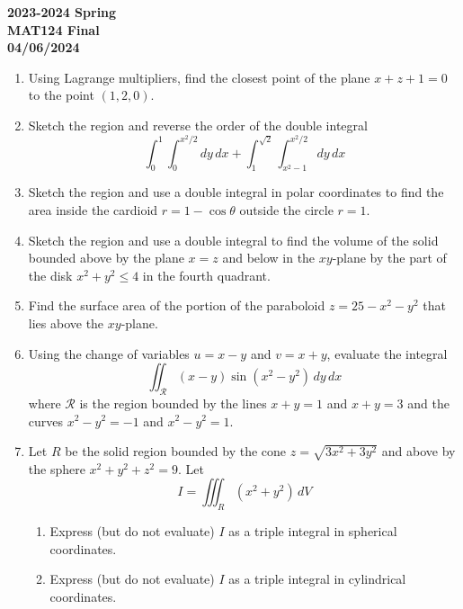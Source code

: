 \documentclass[a4paper, 12pt]{article}
\begin{document}
\pagestyle{empty}

\begin{center}
\textbf{2023-2024 Spring \\MAT124 Final\\04/06/2024}
\end{center}

\begin{enumerate}[leftmargin=*,label=\textbf{\arabic*.}]
\item Using Lagrange multipliers, find the closest point of the plane $x+z+1=0$ to the point $(1,2,0)$.

\item Sketch the region and reverse the order of the double integral
\[\int_0^1\int_0^{x^2/2}dy\,dx+\int_1^{\sqrt2}\int_{x^2-1}^{x^2/2}dy\,dx\]

\item Sketch the region and use a double integral in polar coordinates to find the area inside the cardioid $r=1-\cos\theta$ outside the circle $r=1$.

\item Sketch the region and use a double integral to find the volume of the solid bounded above by the plane $x=z$ and below in the $xy$-plane by the part of the disk $x^2+y^2\leq4$ in the fourth quadrant.

\item Find the surface area of the portion of the paraboloid $z=25-x^2-y^2$ that lies above the $xy$-plane.

\item Using the change of variables $u=x-y$ and $v=x+y$, evaluate the integral
\[\iint_{\mathcal{R}}(x-y)\sin\left(x^2-y^2\right)\,dy\,dx\]
where $\mathcal{R}$ is the region bounded by the lines $x+y=1$ and $x+y=3$ and the curves $x^2-y^2=-1$ and $x^2-y^2=1$.

\item Let $R$ be the solid region bounded by the cone $z=\sqrt{3x^2+3y^2}$ and above by the sphere $x^2+y^2+z^2=9$. Let
\[{I}=\iiint_R\left(x^2+y^2\right)\,dV\]

\begin{enumerate}[leftmargin=*,label=\textbf{\alph*.}]
\item Express (but do not evaluate) ${I}$ as a triple integral in spherical coordinates.
\item Express (but do not evaluate) ${I}$ as a triple integral in cylindrical coordinates.
\end{enumerate}
\end{enumerate}
\end{document}
